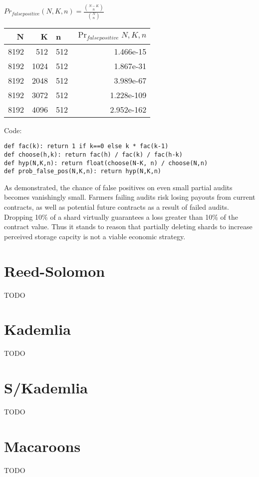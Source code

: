 \documentclass[a4paper,10pt]{article}
\newcommand{\todo}[1]{{\color{red} TODO #1}}
\begin{document}
{\centering
$Pr_{false positive}(N,K,n) = \displaystyle \frac{{N-K \choose n}} {{N \choose
n}}$
\\}

\begin{table}[hbt!]
\begin{center}
\begin{tabular}{r r l r}
N & K & n & $\Pr_{falsepositive}{N,K,n}$\\
\hline 8192 & 512  & 512 & 1.466e-15\\
\hline 8192 & 1024 & 512 & 1.867e-31\\
\hline 8192 & 2048 & 512 & 3.989e-67\\
\hline 8192 & 3072 & 512 & 1.228e-109\\
\hline 8192 & 4096 & 512 & 2.952e-162\\
\end{tabular}
\end{center}
\end{table}

Code:
\begin{lstlisting}
def fac(k): return 1 if k==0 else k * fac(k-1)
def choose(h,k): return fac(h) / fac(k) / fac(h-k)
def hyp(N,K,n): return float(choose(N-K, n) / choose(N,n)
def prob_false_pos(N,K,n): return hyp(N,K,n)
\end{lstlisting}

As demonstrated, the chance of false positives on even small partial audits
becomes vanishingly small. Farmers failing audits risk losing payouts from
current contracts, as well as potential future contracts as a result of failed
audits. Dropping 10\% of a shard virtually guarantees a loss greater than 10\%
of the contract value. Thus it stands to reason that partially deleting shards
to increase perceived storage capcity is not a viable economic strategy.

\newpage
\appendix

\section{Reed-Solomon}

\todo{}

\section{Kademlia}

\todo{}

\section{S/Kademlia}

\todo{}

\section{Macaroons}

\todo{}

\newpage

\begingroup
  \raggedright
  
\endgroup
\end{document}

